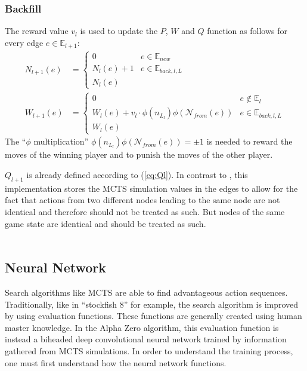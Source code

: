 \documentclass[12pt]{article}
\newcommand{\quckeq}[1]{(\ref{#1})}
\newcommand{\InBreadcrums}[0]{e \in \mathbb E_{back,l,L}}
\begin{document}
\subsubsection{Backfill}
\label{sec:Methods:MCTS:Backfill}
The reward value \(v_l\) is used to update the \(P\), \(W\) and \(Q\) function as follows for every edge \(e\in\mathbb E_{l+1}\):
\begin{align}
N_{l+1}(e) &= \left\{\begin{matrix}
0 & e \in\mathbb E_{new}\\
N_l(e)+1 & \InBreadcrums\\
N_l(e)
\end{matrix}\right.\\
%
W_{l+1}(e) &= \left\{\begin{matrix}
0 & e \not\in\mathbb E_l\\
W_l(e)+v_l\cdot\phi(n_{L_l})\phi(\mathcal N_{from}(e)) & \InBreadcrums\\
W_l(e)
\end{matrix}\right.
\end{align}
The ``\(\phi\) multiplication'' \(\phi(n_{L_l})\phi(\mathcal N_{from}(e)) = \pm 1\) is needed to reward the moves of the winning player and  to punish the moves of the other player.


\noindent\(Q_{l+1}\) is already defined according to \quckeq{eq:Ql}. In contrast to \cite{silver2018general}, this implementation stores the MCTS simulation values in the edges to allow for the fact that actions from two different nodes leading to the same node are not identical and therefore should not be treated as such. But nodes of the same game state are identical and should be treated as such.\\\\
\subsection{Neural Network}
Search algorithms like MCTS are able to find advantageous action sequences. Traditionally, like in ``stockfish 8'' for example, the search algorithm is improved by using evaluation functions. These functions are generally created using human master knowledge. In the Alpha Zero algorithm, this evaluation function is instead a biheaded deep convolutional neural network trained by information gathered from MCTS simulations. In order to understand the training process, one must first understand how the neural network functions.
\label{NN}
\end{document}
